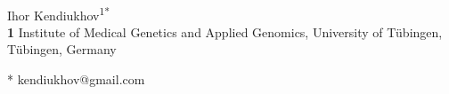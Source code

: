 \documentclass[10pt,letterpaper]{article}
\begin{document}
\vspace*{0.2in}

\begin{flushleft}
{\Large
\textbf{}
}
\newline
\\
Ihor Kendiukhov\textsuperscript{1*}
\\
\bigskip
\textbf{1} Institute of Medical Genetics and Applied Genomics, University of T\"ubingen, T\"ubingen, Germany
\\
\bigskip

* kendiukhov@gmail.com

\end{flushleft}

\end{document}
